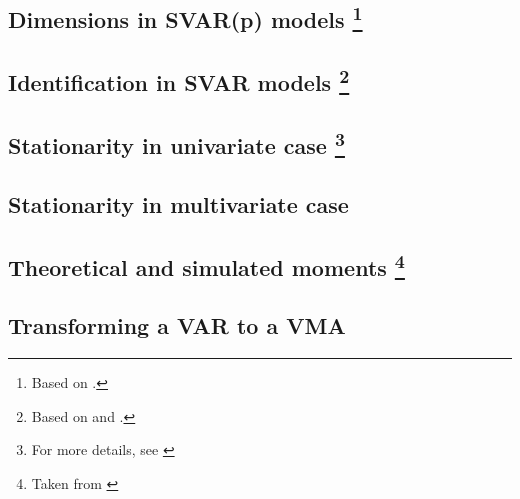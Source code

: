 \documentclass[11pt]{article}
\newcommand*{\svar}{SVAR}
\newcommand*{\svarp}[1][p]{SVAR(#1)}
\begin{document}
\subsection{Dimensions in \texorpdfstring{\svarp{}}{SVAR} models\texorpdfstring{%
        \protect\footnote{Based on \cite[][see the section 17, titled ``Dimensions and VAR(1) representation'']{Mutschler-2018-github_repo}.}%
    }{}}


\subsection{Identification in \texorpdfstring{\svar{}}{SVAR} models\texorpdfstring{%
        \protect\footnote{Based on \cite[][see pages 332-334]{Hamilton-1994} and \cite[][see chapter 14]{MartinHurnHarris-2012}.}%
    }{}}


\subsection{Stationarity in univariate case\texorpdfstring{%
        \protect\footnote{For more details, see \cite[][see Chapter 3, Stationary ARMA processes]{Hamilton-1994}}%
    }{}}


\subsection{Stationarity in multivariate case}


\subsection{Theoretical and simulated moments\texorpdfstring{%
        \protect\footnote{Taken from \cite[][see Sectiona 18, "Theoretical and simulated moments]{Mutschler-2018-github_repo}}%
    }{}}


\subsection{Transforming a VAR to a VMA}

\end{document}
